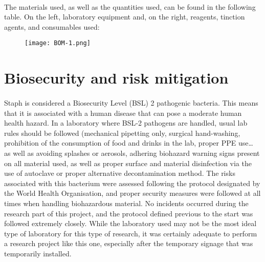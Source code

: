 \paragraph{}The materials used, as well as the quantities used, can be found in the following table. On the left, laboratory equipment and, on the right, reagents, tinction agents, and consumables used:
\begin{center}\begin{figure}[H]\centering\texttt{[image: BOM-1.png]}\end{figure}\end{center}
\section{Biosecurity and risk mitigation}
\paragraph{}Staph is considered a Biosecurity Level (BSL) 2 pathogenic bacteria\cite{cheungPathogenicityVirulenceStaphylococcus2021}. This means that it is associated with a human disease that can pose a moderate human health hazard. In a laboratory where BSL-2 pathogens are handled, usual lab rules should be followed (mechanical pipetting only, surgical hand-washing, prohibition of the consumption of food and drinks in the lab, proper PPE use… as well as avoiding splashes or aerosols, adhering biohazard warning signs present on all material used, as well as proper surface and material disinfection via the use of autoclave or proper alternative decontamination method.\newline
The risks associated with this bacterium were assessed following the protocol designated by the World Health Organisation, and proper security measures were followed at all times when handling biohazardous material. No incidents occurred during the research part of this project, and the protocol defined previous to the start was followed extremely closely. While the laboratory used may not be the most ideal type of laboratory for this type of research, it was certainly adequate to perform a research project like this one, especially after the temporary signage that was temporarily installed\cite{worldhealthorganizationLaboratoryBiosafetyManual2020}.\newpage
